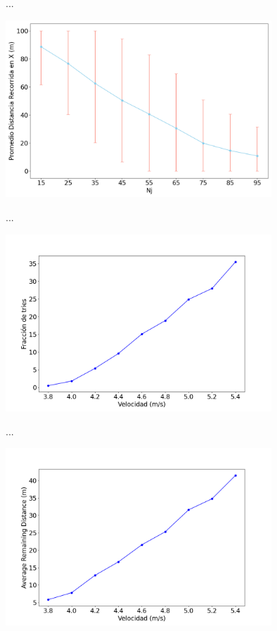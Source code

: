\begin{frame}{...}
    \begin{center}
        \includegraphics[width=0.75\textwidth]{pic/05-resultados/r10}
    \end{center}
\end{frame}

\begin{frame}{...}
    \begin{center}
        \includegraphics[width=0.75\textwidth]{pic/05-resultados/r11}
    \end{center}
\end{frame}

\begin{frame}{...}
    \begin{center}
        \includegraphics[width=0.75\textwidth]{pic/05-resultados/r12}
    \end{center}
\end{frame}
